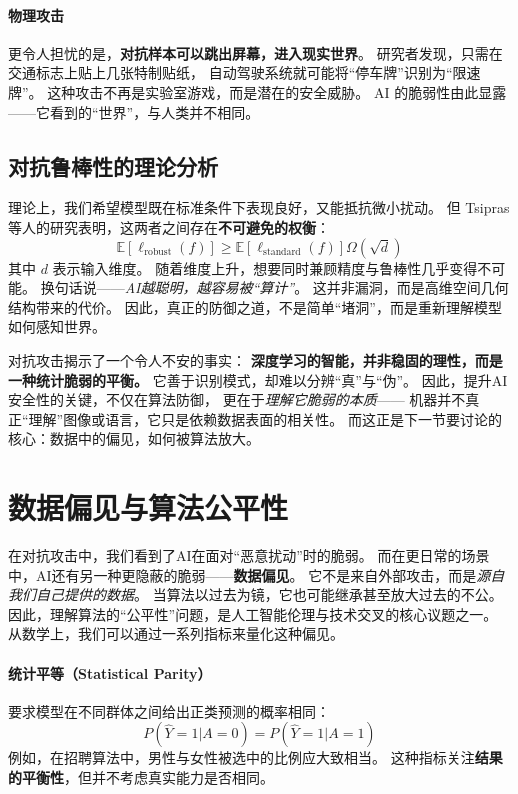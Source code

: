 \paragraph{物理攻击}  
更令人担忧的是，\textbf{对抗样本可以跳出屏幕，进入现实世界}。  
研究者发现，只需在交通标志上贴上几张特制贴纸，  
自动驾驶系统就可能将“停车牌”识别为“限速牌”。  
这种攻击不再是实验室游戏，而是潜在的安全威胁。  
AI 的脆弱性由此显露——它看到的“世界”，与人类并不相同。

\subsection{对抗鲁棒性的理论分析}

理论上，我们希望模型既在标准条件下表现良好，又能抵抗微小扰动。  
但 Tsipras 等人的研究表明，这两者之间存在\textbf{不可避免的权衡}：  
$$\mathbb{E}[\ell_{\text{robust}}(f)] \geq \mathbb{E}[\ell_{\text{standard}}(f)]  \Omega(\sqrt{d})$$  
其中 $d$ 表示输入维度。  
随着维度上升，想要同时兼顾精度与鲁棒性几乎变得不可能。  
换句话说——\textit{AI越聪明，越容易被“算计”}。  
这并非漏洞，而是高维空间几何结构带来的代价。  
因此，真正的防御之道，不是简单“堵洞”，而是重新理解模型如何感知世界。

对抗攻击揭示了一个令人不安的事实：  
\textbf{深度学习的智能，并非稳固的理性，而是一种统计脆弱的平衡。}  
它善于识别模式，却难以分辨“真”与“伪”。  
因此，提升AI安全性的关键，不仅在算法防御，  
更在于\textit{理解它脆弱的本质}——  
机器并不真正“理解”图像或语言，它只是依赖数据表面的相关性。  
而这正是下一节要讨论的核心：数据中的偏见，如何被算法放大。

\section{数据偏见与算法公平性}

在对抗攻击中，我们看到了AI在面对“恶意扰动”时的脆弱。  
而在更日常的场景中，AI还有另一种更隐蔽的脆弱——\textbf{数据偏见}。  
它不是来自外部攻击，而是\textit{源自我们自己提供的数据}。  
当算法以过去为镜，它也可能继承甚至放大过去的不公。  
因此，理解算法的“公平性”问题，是人工智能伦理与技术交叉的核心议题之一。  
从数学上，我们可以通过一系列指标来量化这种偏见。

\paragraph{统计平等（Statistical Parity）}  
要求模型在不同群体之间给出正类预测的概率相同：  
$$P(\hat{Y}=1|A=0) = P(\hat{Y}=1|A=1)$$  
例如，在招聘算法中，男性与女性被选中的比例应大致相当。  
这种指标关注\textbf{结果的平衡性}，但并不考虑真实能力是否相同。

